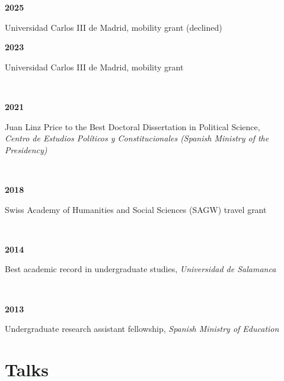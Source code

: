 \documentclass[a4paper, 12pt]{article}
\begin{document}
\begin{minipage}[t]{0.1\textwidth}
\textbf{2025}
\end{minipage}\hfill\begin{minipage}[t]{0.9\textwidth}
Universidad Carlos III de Madrid, mobility grant (declined)
\end{minipage}
\begin{minipage}[t]{0.1\textwidth}
\textbf{2023}
\end{minipage}\hfill\begin{minipage}[t]{0.9\textwidth}
Universidad Carlos III de Madrid, mobility grant
\end{minipage}\\
\begin{minipage}[t]{0.1\textwidth}
\textbf{2021}
\end{minipage}\hfill\begin{minipage}[t]{0.9\textwidth}
Juan Linz Price to the Best Doctoral Dissertation in Political Science,\\\textit{Centro de Estudios Políticos y Constitucionales (Spanish Ministry of the Presidency)}\\\vspace{-8pt}
\end{minipage}\\
\begin{minipage}[t]{0.1\textwidth}
\textbf{2018}
\end{minipage}\hfill\begin{minipage}[t]{0.9\textwidth}
Swiss Academy of Humanities and Social Sciences (SAGW) travel grant
\end{minipage}\\
\begin{minipage}[t]{0.1\textwidth}
\textbf{2014}
\end{minipage}\hfill\begin{minipage}[t]{0.9\textwidth}
Best academic record in undergraduate studies, {\it Universidad de Salamanca}
\end{minipage}\\
\begin{minipage}[t]{0.1\textwidth}
\textbf{2013}
\end{minipage}\hfill\begin{minipage}[t]{0.9\textwidth}
Undergraduate research assistant fellowship, {\it Spanish Ministry of Education}
\end{minipage}

\section*{Talks}
\end{document}
